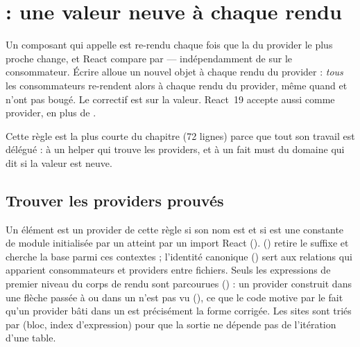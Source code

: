 \section{ : une valeur neuve à chaque rendu}
\label{sec:regles-etat-context}

\begin{react}
Un composant qui appelle  est re-rendu chaque fois que la  du provider le plus proche change, et React compare par  --- indépendamment de  sur le consommateur. Écrire  alloue un nouvel objet à chaque rendu du provider : \emph{tous} les consommateurs re-rendent alors à chaque rendu du provider, même quand  et  n'ont pas bougé. Le correctif est  sur la valeur. React~19 accepte aussi  comme provider, en plus de  \cite{ReactDocs}.
\end{react}

Cette règle est la plus courte du chapitre (72 lignes) parce que tout son travail est délégué : à un helper qui trouve les providers, et à un fait must du domaine qui dit si la valeur est neuve.

\subsection{Trouver les providers prouvés}


Un élément est un provider de cette règle si son nom est  et si  est une constante de module initialisée par un  atteint par un import React ().  () retire le suffixe  et cherche la base parmi ces contextes ; l'identité canonique  () sert aux relations qui apparient consommateurs et providers entre fichiers. Seuls les expressions de premier niveau du corps de rendu sont parcourues () : un provider construit dans une flèche passée à  ou dans un  n'est pas vu (), ce que le code motive par le fait qu'un provider bâti dans un  est précisément la forme corrigée. Les sites sont triés par (bloc, index d'expression) pour que la sortie ne dépende pas de l'itération d'une table.

